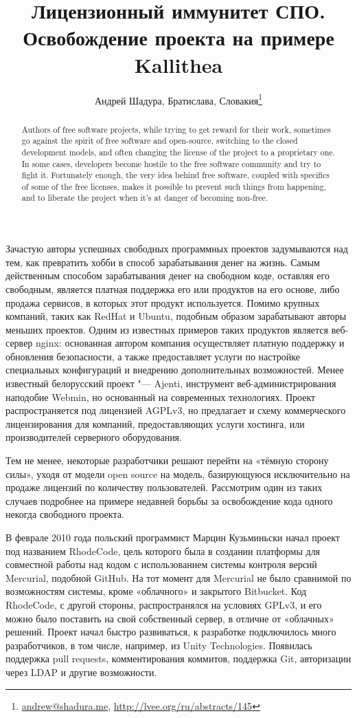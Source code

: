 \documentclass[10pt, a5paper]{article}
\begin{document}
\title{Лицензионный иммунитет СПО. Освобождение проекта на примере Kallithea}
\author{Андрей Шадура, Братислава, Словакия\footnote{\url{andrew@shadura.me}, \url{http://lvee.org/ru/abstracts/145}}}
\maketitle
\begin{abstract}
Authors of free software projects, while trying to get reward for their work, sometimes go against the spirit of free software and open-source, switching to the closed development models, and often changing the license of the project to a proprietary one. In some cases, developers become hostile to the free software community and try to fight it. Fortunately enough, the very idea behind free software, coupled with specifics of some of the free licenses, makes it possible to prevent such things from happening, and to liberate the project when it's at danger of becoming non-free.
\end{abstract}
Зачастую авторы успешных свободных программных проектов задумываются над тем, как превратить хобби в способ зарабатывания денег на жизнь. Самым действенным способом зарабатывания денег на свободном коде, оставляя его свободным, является платная поддержка его или продуктов на его основе, либо продажа сервисов, в которых этот продукт используется. Помимо крупных компаний, таких как RedHat и Ubuntu, подобным образом зарабатывают авторы меньших проектов. Одним из известных примеров таких продуктов является веб-сервер nginx: основанная автором компания осуществляет платную поддержку и обновления безопасности, а также предоставляет услуги по настройке специальных конфигураций и внедрению дополнительных возможностей. Менее известный белорусский проект "--- Ajenti, инструмент веб-администрирования наподобие Webmin, но основанный на современных технологиях. Проект распространяется под лицензией AGPLv3, но предлагает и схему коммерческого лицензирования для компаний, предоставляющих услуги хостинга, или производителей серверного оборудования.

Тем не менее, некоторые разработчики решают перейти на «тёмную сторону силы», уходя от модели open source на модель, базирующуюся исключительно на продаже лицензий по количеству пользователей. Рассмотрим один из таких случаев подробнее на примере недавней борьбы за освобождение кода одного некогда свободного проекта.

В феврале 2010 года польский программист Марцин Кузьминьски начал проект под названием RhodeCode, цель которого была в создании платформы для совместной работы над кодом с использованием системы контроля версий Mercurial, подобной GitHub. На тот момент для Mercurial не было сравнимой по возможностям системы, кроме «облачного» и закрытого Bitbucket. Код RhodeCode, с другой стороны, распространялся на условиях GPLv3, и его можно было поставить на свой собственный сервер, в отличие от «облачных» решений. Проект начал быстро развиваться, к разработке подключилось много разработчиков, в том числе, например, из Unity Technologies. Появилась поддержка pull requests, комментирования коммитов, поддержка Git, авторизации через LDAP и другие возможности.
\end{document}
